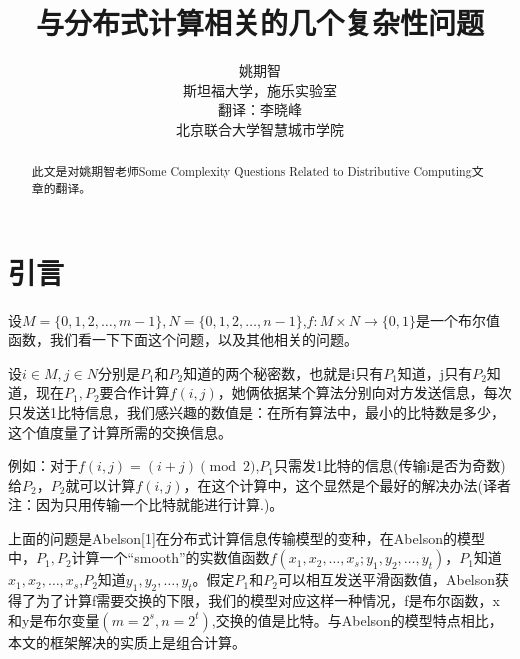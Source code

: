 \documentclass[]{article}
\title{与分布式计算相关的几个复杂性问题}
\author{姚期智\\
	斯坦福大学，施乐实验室\\
{\small  翻译：李晓峰}\\
{\small 北京联合大学智慧城市学院}
}
\begin{document}
	
	\maketitle
	
	\begin{abstract}
		此文是对姚期智老师Some Complexity Questions Related to Distributive Computing文章的翻译。
	\end{abstract}
	
	\section{引言}
	设$M=\{0,1,2,\ldots,m-1\},N=\{0,1,2,\dots,n-1\}$,$f:M\times N \rightarrow \{0,1\}$是一个布尔值函数，我们看一下下面这个问题，以及其他相关的问题。\par
	设$i\in M,j\in N$分别是$P_1$和$P_2$知道的两个秘密数，也就是i只有$P_1$知道，j只有$P_2$知道，现在$P_1,P_2$要合作计算$f(i,j)$，她俩依据某个算法分别向对方发送信息，每次只发送1比特信息，我们感兴趣的数值是：在所有算法中，最小的比特数是多少，这个值度量了计算所需的交换信息。\par
	例如：对于$f(i,j)=(i+j)\pmod{2}$,$P_1$只需发1比特的信息(传输i是否为奇数)给$P_2$，$P_2$就可以计算$f(i,j)$，在这个计算中，这个显然是个最好的解决办法(译者注：因为只用传输一个比特就能进行计算.)。\par
	上面的问题是Abelson[1]在分布式计算信息传输模型的变种，在Abelson的模型中，$P_1,P_2$计算一个“smooth”的实数值函数$f(x_1,x_2,\ldots,x_s;y_1,y_2,\ldots,y_t)$，$P_1$知道$x_1,x_2,\ldots,x_s$,$P_2$知道$y_1,y_2,\ldots,y_t$。假定$P_1$和$P_2$可以相互发送平滑函数值，Abelson获得了为了计算f需要交换的下限，我们的模型对应这样一种情况，f是布尔函数，x和y是布尔变量$(m=2^s,n=2^t)$,交换的值是比特。与Abelson的模型特点相比，本文的框架解决的实质上是组合计算。
	
\end{document}
